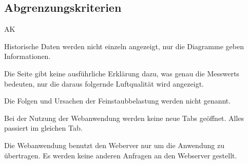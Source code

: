 \subsection{Abgrenzungskriterien}
\setcounter{counter}{10}
\begin{Kriterien}{AK}

	\item Historische Daten werden nicht einzeln angezeigt, nur die Diagramme geben Informationen.
	
	\item Die Seite gibt keine ausführliche Erklärung dazu, was genau die \glspl{Messwert} bedeuten, nur die daraus folgernde Luftqualität wird angezeigt. 
	
	\item Die Folgen und Ursachen der Feinstaubbelastung werden nicht genannt.
	
	\item Bei der Nutzung der \gls{Webanwendung} werden keine neue Tabs geöffnet. Alles passiert im gleichen Tab.
	
	\item Die \gls{Webanwendung} benutzt den Weberver nur um die Anwendung zu übertragen. 
		Es werden keine anderen Anfragen an den \gls{Webserver} gestellt.
	
	
\end{Kriterien}
